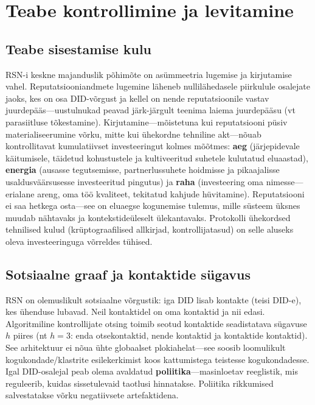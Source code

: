 \documentclass[11pt,a4paper,twocolumn]{article}
\begin{document}
\section{Teabe kontrollimine ja levitamine}

\subsection{Teabe sisestamise kulu}

RSN-i keskne majanduslik põhimõte on asümmeetria lugemise ja kirjutamise vahel. Reputatsiooniandmete lugemine läheneb nullilähedasele piirkulule osalejate jaoks, kes on osa DID-võrgust ja kellel on nende reputatsioonile vastav juurdepääs---uustulnukad peavad järk-järgult teenima laiema juurdepääsu (vt parasiitluse tõkestamine). Kirjutamine---mõistetuna kui reputatsiooni püsiv materialiseerumine võrku, mitte kui ühekordne tehniline akt---nõuab kontrollitavat kumulatiivset investeeringut kolmes mõõtmes: \textbf{aeg} (järjepidevale käitumisele, täidetud kohustustele ja kultiveeritud suhetele kulutatud eluaastad), \textbf{energia} (ausasse tegutsemisse, partnerlussuhete hoidmisse ja pikaajalisse usaldusväärsusesse investeeritud pingutus) ja \textbf{raha} (investeering oma nimesse---erialane areng, oma töö kvaliteet, tekitatud kahjude hüvitamine). Reputatsiooni ei saa hetkega osta---see on eluaegse kogunemise tulemus, mille süsteem üksnes muudab nähtavaks ja kontekstideüleselt ülekantavaks. Protokolli ühekordsed tehnilised kulud (krüptograafilised allkirjad, kontrollijatasud) on selle aluseks oleva investeeringuga võrreldes tühised.

\subsection{Sotsiaalne graaf ja kontaktide sügavus}

RSN on olemuslikult sotsiaalne võrgustik: iga DID lisab kontakte (teisi DID-e), kes ühenduse lubavad. Neil kontaktidel on oma kontaktid ja nii edasi. Algoritmiline kontrollijate otsing toimib seotud kontaktide seadistatava sügavuse $h$ piires (nt $h=3$: enda otsekontaktid, nende kontaktid ja kontaktide kontaktid). See arhitektuur ei nõua ühte globaalset plokiahelat---see soosib loomulikult kogukondade/klastrite esilekerkimist koos kattumistega teistesse kogukondadesse. Igal DID-osalejal peab olema avaldatud \textbf{poliitika}---masinloetav reeglistik, mis reguleerib, kuidas sissetulevaid taotlusi hinnatakse. Poliitika rikkumised salvestatakse võrku negatiivsete artefaktidena.
\end{document}
